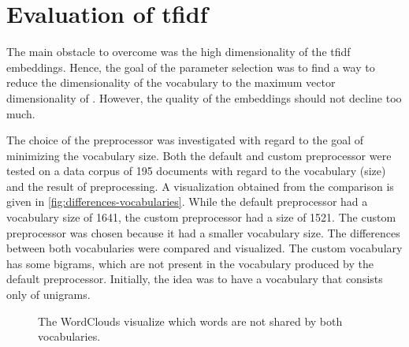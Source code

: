 \section{Evaluation of \acs{tfidf}}\label{sec:evaluation-tfidf}

The main obstacle to overcome was the high dimensionality of the \ac{tfidf} embeddings.
Hence, the goal of the parameter selection was to find a way to reduce the dimensionality of the vocabulary to the maximum vector dimensionality of \databaseName{}.
However, the quality of the embeddings should not decline too much.

The choice of the preprocessor was investigated with regard to the goal of minimizing the vocabulary size.
Both the default and custom preprocessor were tested on a data corpus of 195 documents with regard to the vocabulary (size) and the result of preprocessing.
A visualization obtained from the comparison is given in \autoref{fig:differences-vocabularies}.
While the default preprocessor had a vocabulary size of 1641, the custom preprocessor had a size of 1521.
The custom preprocessor was chosen because it had a smaller vocabulary size.
The differences between both vocabularies were compared and visualized.
The custom vocabulary has some bigrams, which are not present in the vocabulary produced by the default preprocessor.
Initially, the idea was to have a vocabulary that consists only of unigrams.

\begin{figure}%
    \centering
    \qquad
    \caption{The WordClouds visualize which words are not shared by both vocabularies.}%
    \label{fig:differences-vocabularies}%
\end{figure}

